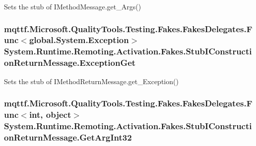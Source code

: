 Sets the stub of I\-Method\-Message.\-get\-\_\-\-Args()

\hypertarget{class_system_1_1_runtime_1_1_remoting_1_1_activation_1_1_fakes_1_1_stub_i_construction_return_message_a8777eb4cb3f50768d7dae859e575b475}{
\subsubsection[{Exception\-Get}]{\setlength{\rightskip}{0pt plus 5cm}mqttf.\-Microsoft.\-Quality\-Tools.\-Testing.\-Fakes.\-Fakes\-Delegates.\-Func$<$global.\-System.\-Exception$>$ System.\-Runtime.\-Remoting.\-Activation.\-Fakes.\-Stub\-I\-Construction\-Return\-Message.\-Exception\-Get}}\label{class_system_1_1_runtime_1_1_remoting_1_1_activation_1_1_fakes_1_1_stub_i_construction_return_message_a8777eb4cb3f50768d7dae859e575b475}


Sets the stub of I\-Method\-Return\-Message.\-get\-\_\-\-Exception()

\hypertarget{class_system_1_1_runtime_1_1_remoting_1_1_activation_1_1_fakes_1_1_stub_i_construction_return_message_a9bdc2709685d0d468b487b1ba503a108}{
\subsubsection[{Get\-Arg\-Int32}]{\setlength{\rightskip}{0pt plus 5cm}mqttf.\-Microsoft.\-Quality\-Tools.\-Testing.\-Fakes.\-Fakes\-Delegates.\-Func$<$int, object$>$ System.\-Runtime.\-Remoting.\-Activation.\-Fakes.\-Stub\-I\-Construction\-Return\-Message.\-Get\-Arg\-Int32}}\label{class_system_1_1_runtime_1_1_remoting_1_1_activation_1_1_fakes_1_1_stub_i_construction_return_message_a9bdc2709685d0d468b487b1ba503a108}


